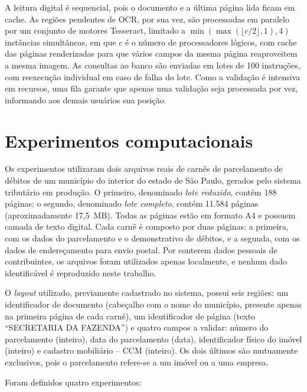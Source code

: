 \documentclass[article,12pt,oneside,a4paper,english,brazil]{abntex2}
\begin{document}
A leitura digital é sequencial, pois o documento e a última página lida ficam em cache.
As regiões pendentes de OCR, por sua vez, são processadas em paralelo por um conjunto de
motores Tesseract, limitado a $\min(\max(\lfloor c/2 \rfloor, 1), 4)$ instâncias
simultâneas, em que $c$ é o número de processadores lógicos, com cache das páginas
renderizadas para que vários campos da mesma página reaproveitem a mesma imagem. As
consultas ao banco são enviadas em lotes de 100 instruções, com reexecução individual
em caso de falha do lote. Como a validação é intensiva em recursos, uma fila garante que
apenas uma validação seja processada por vez, informando aos demais usuários sua posição.

\section{Experimentos computacionais}\label{sec:experimentos}

Os experimentos utilizaram dois arquivos reais de carnês de parcelamento de débitos de
um município do interior do estado de São Paulo, gerados pelo sistema tributário em
produção. O primeiro, denominado \emph{lote reduzido}, contém 188 páginas; o segundo,
denominado \emph{lote completo}, contém 11.584 páginas (aproximadamente 17,5~MB). Todas
as páginas estão em formato A4 e possuem camada de texto digital. Cada carnê é composto
por duas páginas: a primeira, com os dados do parcelamento e o demonstrativo de débitos,
e a segunda, com os dados de endereçamento para envio postal. Por conterem dados pessoais
de contribuintes, os arquivos foram utilizados apenas localmente, e nenhum dado
identificável é reproduzido neste trabalho.

O \textit{layout} utilizado, previamente cadastrado no sistema, possui seis regiões: um
identificador de documento (cabeçalho com o nome do município, presente apenas na
primeira página de cada carnê), um identificador de página (texto ``SECRETARIA DA
FAZENDA'') e quatro campos a validar: número do parcelamento (inteiro), data do
parcelamento (data), identificador físico do imóvel (inteiro) e cadastro mobiliário --
CCM (inteiro). Os dois últimos são mutuamente exclusivos, pois o parcelamento refere-se
a um imóvel ou a uma empresa.

Foram definidos quatro experimentos:
\end{document}
